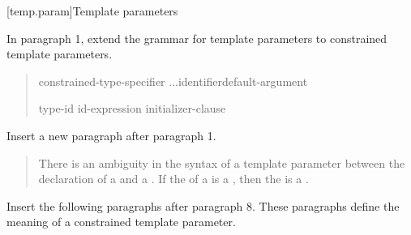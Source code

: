 [temp.param]{Template parameters}

In paragraph 1, extend the grammar for template parameters to 
constrained template parameters.

\begin{quote}
\pnum

\begin{bnf}
\br

\begin{addedblock}
\br
  constrained-type-specifier ...\opt identifier\opt default-argument\opt\br

\br
  \terminal{=} type-id\br
  \terminal{=} id-expression\br
  \terminal{=} initializer-clause\br
\end{addedblock}
\end{bnf}
\end{quote}

Insert a new paragraph after paragraph 1.

\begin{quote}
\pnum
There is an ambiguity in the syntax of a template parameter between the
declaration of a  and a
.
% 
If the  of a  
is a , then the 
 is a .
\end{quote}

Insert the following paragraphs after paragraph 8. These paragraphs
define the meaning of a constrained template parameter.

